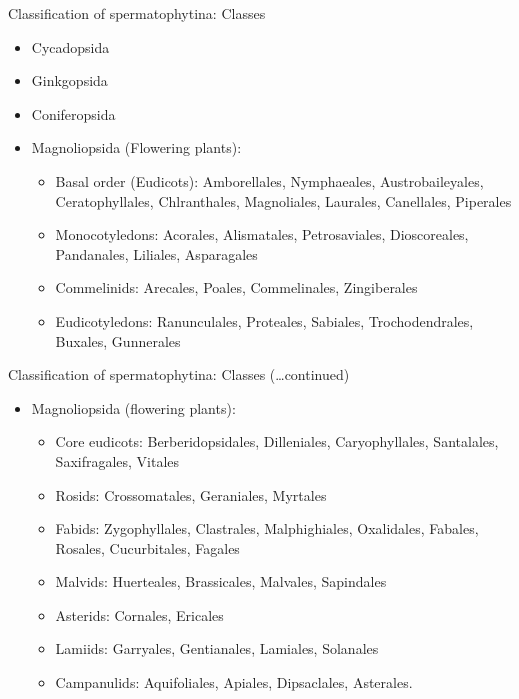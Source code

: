 \documentclass[ignorenonframetext,aspectratio=169]{beamer}
\providecommand{\tightlist}{%
  \setlength{\itemsep}{0pt}\setlength{\parskip}{0pt}}
\begin{document}
\begin{frame}{Classification of spermatophytina: Classes}
\protect\hypertarget{classification-of-spermatophytina-classes}{}

\begin{itemize}
\tightlist
\item
  Cycadopsida
\item
  Ginkgopsida
\item
  Coniferopsida
\item
  Magnoliopsida (Flowering plants):

  \begin{itemize}
  \tightlist
  \item
    Basal order (Eudicots): Amborellales, Nymphaeales, Austrobaileyales,
    Ceratophyllales, Chlranthales, Magnoliales, Laurales, Canellales,
    Piperales
  \item
    Monocotyledons: Acorales, Alismatales, Petrosaviales, Dioscoreales,
    Pandanales, Liliales, Asparagales
  \item
    Commelinids: Arecales, Poales, Commelinales, Zingiberales
  \item
    Eudicotyledons: Ranunculales, Proteales, Sabiales, Trochodendrales,
    Buxales, Gunnerales
  \end{itemize}
\end{itemize}

\end{frame}

\begin{frame}{Classification of spermatophytina: Classes
(\ldots{}continued)}
\protect\hypertarget{classification-of-spermatophytina-classes-continued}{}

\begin{itemize}
\tightlist
\item
  Magnoliopsida (flowering plants):

  \begin{itemize}
  \tightlist
  \item
    Core eudicots: Berberidopsidales, Dilleniales, Caryophyllales,
    Santalales, Saxifragales, Vitales
  \item
    Rosids: Crossomatales, Geraniales, Myrtales
  \item
    Fabids: Zygophyllales, Clastrales, Malphighiales, Oxalidales,
    Fabales, Rosales, Cucurbitales, Fagales
  \item
    Malvids: Huerteales, Brassicales, Malvales, Sapindales
  \item
    Asterids: Cornales, Ericales
  \item
    Lamiids: Garryales, Gentianales, Lamiales, Solanales
  \item
    Campanulids: Aquifoliales, Apiales, Dipsaclales, Asterales.
  \end{itemize}
\end{itemize}

\end{frame}
\end{document}
